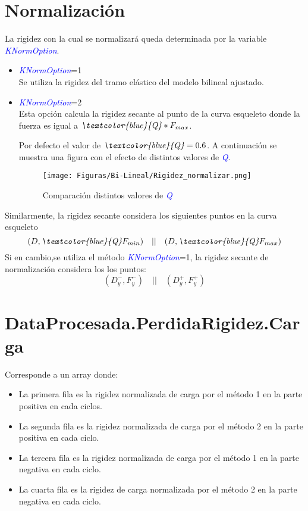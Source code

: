\documentclass[a4paper, 11pt,article,oneside]{memoir}%
\begin{document}
 \section{Normalización}
 La rigidez con la cual se normalizará queda determinada por la variable  \textit{\textcolor{blue}{KNormOption}}.
\begin{itemize}
    \item \textit{\textcolor{blue}{KNormOption}}=1\\
    Se  utiliza la rigidez del tramo elástico del modelo bilineal ajustado.
    \item \textit{\textcolor{blue}{KNormOption}}=2\\
    Esta opción calcula la rigidez secante al punto de la curva esqueleto donde la fuerza es igual a $\textit{\textcolor{blue}{Q}}*F_{max}$.\par
    Por defecto el valor de $\textit{\textcolor{blue}{Q}}=0.6$. A continuación se muestra una figura con el efecto de distintos valores de \textit{\textcolor{blue}{Q}}.
    \begin{figure} [H]
    \centering
    \texttt{[image: Figuras/Bi-Lineal/Rigidez\_normalizar.png]}
    \caption{\label{Bi-Lineal norm} Comparación distintos valores de \textit{\textcolor{blue}{Q}}}
    \end{figure}
\end{itemize}
Similarmente, la rigidez secante considera los siguientes puntos en la curva esqueleto 
\begin{equation*}
    (D,\textit{\textcolor{blue}{Q}}F_{min})\quad ||\quad (D,\textit{\textcolor{blue}{Q}}F_{max})
\end{equation*}
Si en cambio,se utiliza  el método \textit{\textcolor{blue}{KNormOption}}=1, la rigidez secante de normalización considera los los puntos: 
\begin{equation*}
    (D_y^-,F_y^-)\quad ||\quad (D_y^+,F_y^+)
\end{equation*}
\section{DataProcesada.PerdidaRigidez.Carga}
Corresponde a un array donde: 
\begin{itemize}
    \item La primera fila es la rigidez normalizada de carga por el método 1 en la parte positiva en cada ciclos.
    \item  La segunda fila es la rigidez normalizada de carga por el método 2 en la parte positiva en cada ciclo.
     \item  La tercera fila es la rigidez normalizada de carga por el método 1 en la parte negativa en cada ciclo.
     \item  La cuarta fila es la rigidez de carga normalizada por el método 2 en la parte negativa en cada ciclo.
\end{itemize}
\end{document}
